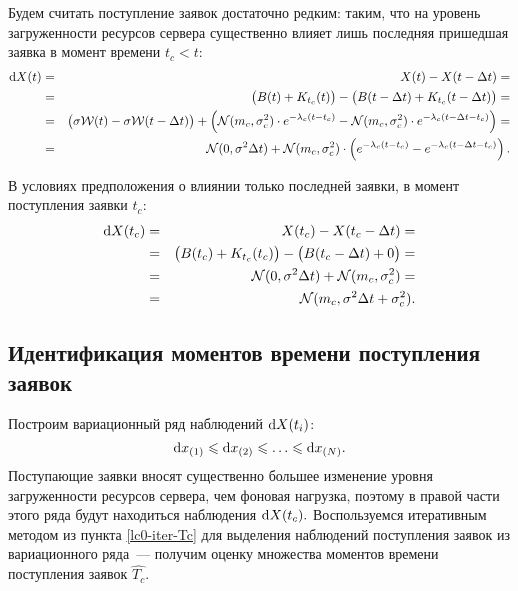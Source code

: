 \documentclass[a4paper,10pt]{article}
\begin{document}
Будем считать поступление заявок достаточно редким: таким, что на уровень
загруженности ресурсов сервера существенно влияет лишь последняя пришедшая 
заявка в момент времени $t_c < t$:
\begin{eqnarray*}
\dif X(t) 
  & = & X(t) - X(t - \Delta t) = \\
  & = & \del{B(t) + K_{t_c}(t)} - 
      \del{B(t - \Delta t) + K_{t_c}(t - \Delta t)} = \\
  & = & \del{\sigma \mathcal{W}(t) - \sigma \mathcal{W}(t - \Delta t)} +
      \del{\mathcal{N}(m_c, \sigma_c^2) \cdot e^{-\lambda_c(t - t_c)} - 
           \mathcal{N}(m_c, \sigma_c^2) \cdot 
              e^{-\lambda_c(t - \Delta t - t_c)}} = \\
  & = & \mathcal{N}(0, \sigma^2 \Delta t) + 
      \mathcal{N}(m_c, \sigma_c^2) \cdot 
        \del{e^{-\lambda_c(t - t_c)} - e^{-\lambda_c(t - \Delta t - t_c)}}.
\end{eqnarray*}

В условиях предположения о влиянии только последней заявки, 
в момент поступления заявки $t_c$:
\begin{eqnarray*}
\dif X(t_c) 
  & = & X(t_c) - X(t_c - \Delta t) = \\
  & = & \del{B(t_c) + K_{t_c}(t_c)} - 
      \del{B(t_c - \Delta t) + 0} = \\
  & = & \mathcal{N}(0, \sigma^2 \Delta t) + 
      \mathcal{N}(m_c, \sigma_c^2) = \\
  & = & \mathcal{N}(m_c, \sigma^2 \Delta t + \sigma_c^2).
\end{eqnarray*}

\subsection{Идентификация моментов времени поступления заявок}
Построим вариационный ряд наблюдений $\dif X(t_i)$:
$$\dif x_{(1)} \leqslant \dif x_{(2)} \leqslant \ldots 
  \leqslant \dif x_{(N)}.$$
Поступающие заявки вносят существенно большее изменение уровня загруженности
ресурсов сервера, чем фоновая нагрузка, 
поэтому в правой части этого ряда будут находиться наблюдения 
$\dif X(t_c).$
Воспользуемся итеративным методом из пункта \ref{lc0-iter-Tc} для выделения
наблюдений поступления заявок из вариационного ряда~--- 
получим оценку множества моментов времени поступления заявок $\widehat{T_c}$.
\end{document}
